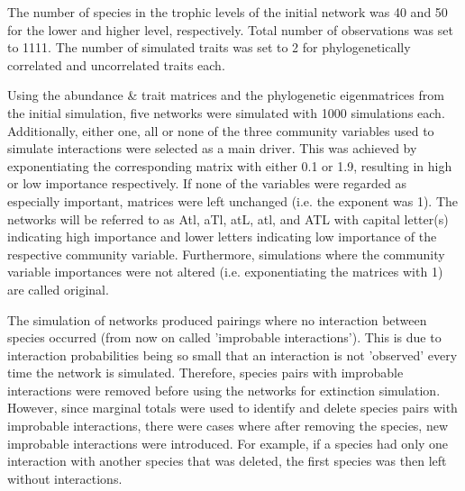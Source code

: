 \documentclass[12pt,a4paper]{article}
\begin{document}
	
	The number of species in the trophic levels of the initial network was 40 and 50 for the lower and higher level, respectively. Total number of observations was set to 1111. The number of simulated traits was set to 2 for phylogenetically correlated and uncorrelated traits each.
	

	Using the abundance \& trait matrices and the phylogenetic eigenmatrices from the initial simulation, five networks were simulated with 1000 simulations each. Additionally, either one, all or none of the three community variables used to simulate interactions were selected as a main driver. This was achieved by exponentiating the corresponding matrix with either 0.1 or 1.9, resulting in high or low importance respectively. If none of the variables were regarded as especially important, matrices were left unchanged (i.e. the exponent was 1). The networks will be referred to as Atl, aTl, atL, atl, and ATL with capital letter(s) indicating high importance and lower letters indicating low importance of the respective community variable. Furthermore, simulations where the community variable importances were not altered (i.e. exponentiating the matrices with 1) are called original.
	
	 The simulation of networks produced pairings where no interaction between species occurred (from now on called 'improbable interactions'). This is due to interaction probabilities being so small that an interaction is not 'observed' every time the network is simulated. Therefore, species pairs with improbable interactions were removed before using the networks for extinction simulation. However, since marginal totals were used to identify and delete species pairs with improbable interactions, there were cases where after removing the species, new improbable interactions were introduced. For example, if a species had only one interaction with another species that was deleted, the first species was then left without interactions.
	 
\end{document}
